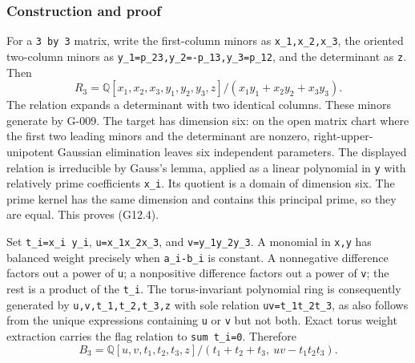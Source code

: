 \documentclass[
  10pt,
]{article}
\begin{document}
\subsubsection{Construction and proof}\label{construction-and-proof}

For a \texttt{\small 3 by 3} matrix, write the first-column minors as
\texttt{\small x\_\allowbreak{}1,\allowbreak{}x\_\allowbreak{}2,\allowbreak{}x\_\allowbreak{}3},
the oriented two-column minors as
\texttt{\small y\_\allowbreak{}1=\allowbreak{}p\_\allowbreak{}23,\allowbreak{}y\_\allowbreak{}2=\allowbreak{}-\allowbreak{}p\_\allowbreak{}13,\allowbreak{}y\_\allowbreak{}3=\allowbreak{}p\_\allowbreak{}12},
and the determinant as \texttt{\small z}. Then \[
R_3=\mathbb Q[x_1,x_2,x_3,y_1,y_2,y_3,z]/(x_1y_1+x_2y_2+x_3y_3).
\tag{G12.4}
\] The relation expands a determinant with two identical columns. These
minors generate by G-009. The target has dimension six: on the open
matrix chart where the first two leading minors and the determinant are
nonzero, right-upper-unipotent Gaussian elimination leaves six
independent parameters. The displayed relation is irreducible by Gauss's
lemma, applied as a linear polynomial in \texttt{\small y} with
relatively prime coefficients \texttt{\small x\_\allowbreak{}i}. Its
quotient is a domain of dimension six. The prime kernel has the same
dimension and contains this principal prime, so they are equal. This
proves (G12.4).

Set
\texttt{\small t\_\allowbreak{}i=\allowbreak{}x\_\allowbreak{}i y\_\allowbreak{}i},
\texttt{\small u=\allowbreak{}x\_\allowbreak{}1x\_\allowbreak{}2x\_\allowbreak{}3},
and
\texttt{\small v=\allowbreak{}y\_\allowbreak{}1y\_\allowbreak{}2y\_\allowbreak{}3}.
A monomial in \texttt{\small x,\allowbreak{}y} has balanced weight
precisely when
\texttt{\small a\_\allowbreak{}i-\allowbreak{}b\_\allowbreak{}i} is
constant. A nonnegative difference factors out a power of
\texttt{\small u}; a nonpositive difference factors out a power of
\texttt{\small v}; the rest is a product of the
\texttt{\small t\_\allowbreak{}i}. The torus-invariant polynomial ring
is consequently generated by
\texttt{\small u,\allowbreak{}v,\allowbreak{}t\_\allowbreak{}1,\allowbreak{}t\_\allowbreak{}2,\allowbreak{}t\_\allowbreak{}3,\allowbreak{}z}
with sole relation
\texttt{\small uv=\allowbreak{}t\_\allowbreak{}1t\_\allowbreak{}2t\_\allowbreak{}3},
as also follows from the unique expressions containing \texttt{\small u}
or \texttt{\small v} but not both. Exact torus weight extraction carries
the flag relation to
\texttt{\small sum t\_\allowbreak{}i=\allowbreak{}0}. Therefore \[
B_3=\mathbb Q[u,v,t_1,t_2,t_3,z]/(t_1+t_2+t_3,\ uv-t_1t_2t_3).
\tag{G12.5}
\]
\end{document}
